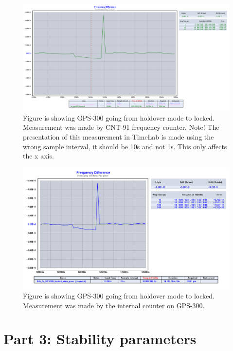 \documentclass[11pt,english,a4paper]{article}
\begin{document}
\begin{figure}[!htb]
  \centering
    \includegraphics[width=1\textwidth]{del_2_spm3_fra_holdover_to_locked.png}
      \caption{Figure is showing GPS-300 going from holdover mode to locked. Measurement was made by CNT-91 frequency counter. Note! The presentation of this measurement in TimeLab is made using the wrong sample interval, it should be 10s and not 1s. This only affects the x axis.}
          \label{fig:del_2_spm3_fra_holdover_to_locked}
\end{figure}

\begin{figure}[!htb]
  \centering
    \includegraphics[width=1\textwidth]{del_2_spm3_fra_holdover_to_locked_z38.png}
      \caption{Figure is showing GPS-300 going from holdover mode to locked. Measurement was made by the internal counter on GPS-300.}
          \label{fig:del_2_spm3_fra_holdover_to_locked_z38}
\end{figure}


\section{Part 3: Stability parameters}
\end{document}

